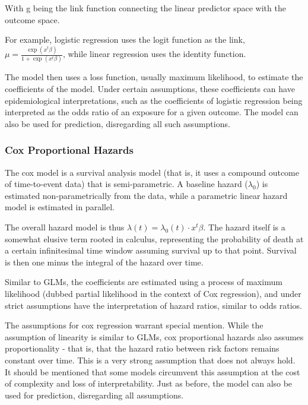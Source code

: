 \documentclass[a4paper,12pt]{article}
\begin{document}
			With g being the link function connecting the linear predictor space with the outcome space.
			
			For example, logistic regression uses the logit function as the link, $ \mu = \frac{\exp (x^t \beta)}{1 + \exp (x^t \beta)} $, while linear regression uses the identity function.
			
			The model then uses a loss function, usually maximum likelihood, to estimate the coefficients of the model. Under certain assumptions, these coefficients can have epidemiological interpretations, such as the coefficients of logistic regression being interpreted as the odds ratio of an exposure for a given outcome. The model can also be used for prediction, disregarding all such assumptions.
			
			\subsubsection{Cox Proportional Hazards}
			
			The cox model is a survival analysis model (that is, it uses a compound outcome of time-to-event data) that is semi-parametric. A baseline hazard ($ \lambda_0 $) is estimated non-parametrically from the data, while a parametric linear hazard model is estimated in parallel\cite{Cox1972}.
			
			The overall hazard model is thus $ \lambda(t) = \lambda_0(t) \cdot x^t \beta $. The hazard itself is a somewhat elusive term rooted in calculus, representing the probability of death at a certain infinitesimal time window assuming survival up to that point. Survival is then one minus the integral of the hazard over time.
			
			Similar to GLMs, the coefficients are estimated using a process of maximum likelihood (dubbed partial likelihood in the context of Cox regression), and under strict assumptions have the interpretation of hazard ratios, similar to odds ratios.
			
			The assumptions for cox regression warrant special mention. While the assumption of linearity is similar to GLMs, cox proportional hazards also assumes proportionality - that is, that the hazard ratio between risk factors remains constant over time. This is a very strong assumption that does not always hold. It should be mentioned that some models circumvent this assumption at the cost of complexity and loss of interpretability. Just as before, the model can also be used for prediction, disregarding all assumptions.
			
\end{document}
